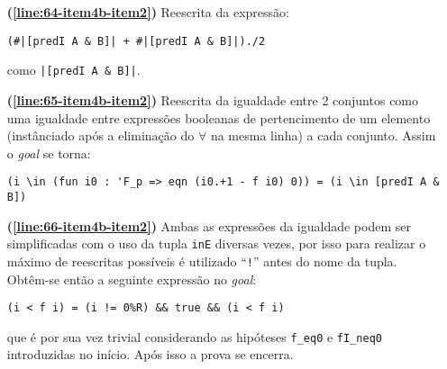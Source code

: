 \begin{enumerate}[label=\textbf{\roman*.}]
\begin{enumerate}[label=\textbf{\roman{enumi}.(\alph*)}]
\begin{enumerate}[label=\textbf{(\alph{enumii}.\arabic*)}]
\begin{enumerate}[listparindent=\parindent]
                                \item[\textbf{(\ref{line:64-item4b-item2})}] Reescrita da expressão:
                                        
                                        \begin{lstlisting}[language=coq,frame=single,tabsize=1]
(#|[predI A & B]| + #|[predI A & B]|)./2
                                        \end{lstlisting}
                                como \lstinline[language=coq]!|[predI A & B]|!.
                                
                                \item[\textbf{(\ref{line:65-item4b-item2})}] Reescrita da igualdade entre 2 conjuntos como uma igualdade entre expressões booleanas de pertencimento de um elemento (instânciado após a eliminação do $\forall$ na mesma linha) a cada conjunto. Assim o \textit{goal} se torna:
                                
                                        \begin{lstlisting}[language=coq,frame=single,tabsize=1]
(i \in (fun i0 : 'F_p => eqn (i0.+1 - f i0) 0)) = (i \in [predI A & B])
                                        \end{lstlisting}

                                \item[\textbf{(\ref{line:66-item4b-item2})}] Ambas as expressões da igualdade podem ser simplificadas com o uso da tupla \lstinline[language=coq]|inE| diversas vezes, por isso para realizar o máximo de reescritas possíveis é utilizado ``\lstinline[language=coq]|!|'' antes do nome da tupla. Obtêm-se então a seguinte expressão no \textit{goal}:
                                
                                        \begin{lstlisting}[language=coq,frame=single,tabsize=1]
(i < f i) = (i != 0%R) && true && (i < f i)
                                        \end{lstlisting}
                                que é por sua vez trivial considerando as hipóteses \lstinline[language=coq]|f_eq0| e \lstinline[language=coq]|fI_neq0| introduzidas no início. Após isso a prova se encerra.
                                

                        \end{enumerate}

                \end{enumerate}


\end{enumerate}
\end{enumerate}
